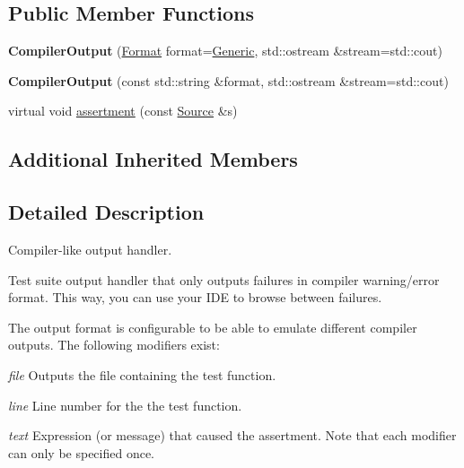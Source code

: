 \subsection*{Public Member Functions}
\begin{DoxyCompactItemize}
\item 
{\bfseries Compiler\+Output} (\hyperlink{class_test_1_1_compiler_output_ab34cf506804cefbc67545a256af196ff}{Format} format=\hyperlink{class_test_1_1_compiler_output_ab34cf506804cefbc67545a256af196ffa1a83926858dfb1bab06bc0a313a49dac}{Generic}, std\+::ostream \&stream=std\+::cout)\hypertarget{class_test_1_1_compiler_output_a816ae9a0ff2fb6cbb95c7cd815a6e621}{}\label{class_test_1_1_compiler_output_a816ae9a0ff2fb6cbb95c7cd815a6e621}

\item 
{\bfseries Compiler\+Output} (const std\+::string \&format, std\+::ostream \&stream=std\+::cout)\hypertarget{class_test_1_1_compiler_output_a49f7092d23ce60e3b83fa30fb5ab9ab7}{}\label{class_test_1_1_compiler_output_a49f7092d23ce60e3b83fa30fb5ab9ab7}

\item 
virtual void \hyperlink{class_test_1_1_compiler_output_ae276b6874eb54c8b1e3d8e3c610522dc}{assertment} (const \hyperlink{class_test_1_1_source}{Source} \&s)
\end{DoxyCompactItemize}
\subsection*{Additional Inherited Members}


\subsection{Detailed Description}
Compiler-\/like output handler. 

Test suite output handler that only outputs failures in compiler warning/error format. This way, you can use your I\+DE to browse between failures.

The output format is configurable to be able to emulate different compiler outputs. The following modifiers exist\+:
\begin{DoxyItemize}
\item {\itshape file} Outputs the file containing the test function.
\item {\itshape line} Line number for the the test function.
\item {\itshape text} Expression (or message) that caused the assertment. Note that each modifier can only be specified once. 
\end{DoxyItemize}

